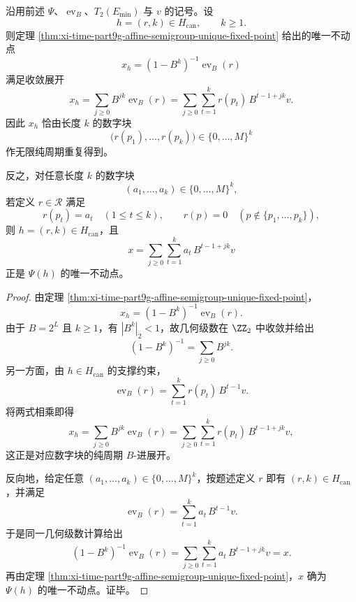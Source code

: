 \begin{theorem}\label{thm:xi-time-part9g-canonical-fixed-point-badic-periodic}
沿用前述 \(\Psi\)、\(\operatorname{ev}_B\)、\(T_2(E_{\min})\) 与 \(v\) 的记号。设
\[
h=(r,k)\in H_{\mathrm{can}},
\qquad
k\ge 1.
\]
则定理 \ref{thm:xi-time-part9g-affine-semigroup-unique-fixed-point} 给出的唯一不动点
\[
x_h=(1-B^k)^{-1}\operatorname{ev}_B(r)
\]
满足收敛展开
\[
x_h
=
\sum_{j\ge 0}B^{jk}\operatorname{ev}_B(r)
=
\sum_{j\ge 0}\sum_{t=1}^{k} r(p_t)\,B^{t-1+jk}v.
\]
因此 \(x_h\) 恰由长度 \(k\) 的数字块
\[
\bigl(r(p_1),\dots,r(p_k)\bigr)\in\{0,\dots,M\}^{k}
\]
作无限纯周期重复得到。

反之，对任意长度 \(k\) 的数字块
\[
(a_1,\dots,a_k)\in\{0,\dots,M\}^{k},
\]
若定义 \(r\in\mathcal R\) 满足
\[
r(p_t)=a_t\quad (1\le t\le k),
\qquad
r(p)=0\quad (p\notin\{p_1,\dots,p_k\}),
\]
则 \(h=(r,k)\in H_{\mathrm{can}}\)，且
\[
x=\sum_{j\ge 0}\sum_{t=1}^{k} a_t\,B^{t-1+jk}v
\]
正是 \(\Psi(h)\) 的唯一不动点。
\end{theorem}
\begin{proof}
由定理 \ref{thm:xi-time-part9g-affine-semigroup-unique-fixed-point}，
\[
x_h=(1-B^k)^{-1}\operatorname{ev}_B(r).
\]
由于 \(B=2^L\) 且 \(k\ge 1\)，有 \(|B^k|_2<1\)，故几何级数在 \(\ZZ_2\) 中收敛并给出
\[
(1-B^k)^{-1}=\sum_{j\ge 0}B^{jk}.
\]
另一方面，由 \(h\in H_{\mathrm{can}}\) 的支撑约束，
\[
\operatorname{ev}_B(r)=\sum_{t=1}^{k}r(p_t)\,B^{t-1}v.
\]
将两式相乘即得
\[
x_h
=
\sum_{j\ge 0}B^{jk}\operatorname{ev}_B(r)
=
\sum_{j\ge 0}\sum_{t=1}^{k} r(p_t)\,B^{t-1+jk}v,
\]
这正是对应数字块的纯周期 \(B\)-进展开。

反向地，给定任意 \((a_1,\dots,a_k)\in\{0,\dots,M\}^{k}\)，按题述定义 \(r\) 即有
\((r,k)\in H_{\mathrm{can}}\)，并满足
\[
\operatorname{ev}_B(r)=\sum_{t=1}^{k}a_t\,B^{t-1}v.
\]
于是同一几何级数计算给出
\[
(1-B^k)^{-1}\operatorname{ev}_B(r)
=
\sum_{j\ge 0}\sum_{t=1}^{k} a_t\,B^{t-1+jk}v=x.
\]
再由定理 \ref{thm:xi-time-part9g-affine-semigroup-unique-fixed-point}，\(x\) 确为 \(\Psi(h)\) 的唯一不动点。证毕。
\end{proof}

